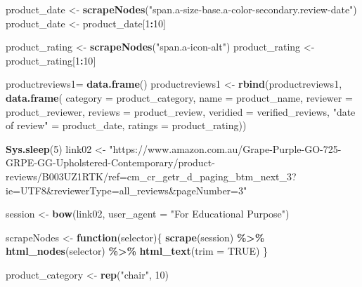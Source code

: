 \documentclass[
]{article}
\newenvironment{Shaded}{\begin{snugshade}}{\end{snugshade}}
\newcommand{\AttributeTok}[1]{\textcolor[rgb]{0.13,0.29,0.53}{#1}}
\newcommand{\ConstantTok}[1]{\textcolor[rgb]{0.56,0.35,0.01}{#1}}
\newcommand{\ControlFlowTok}[1]{\textcolor[rgb]{0.13,0.29,0.53}{\textbf{#1}}}
\newcommand{\DecValTok}[1]{\textcolor[rgb]{0.00,0.00,0.81}{#1}}
\newcommand{\FunctionTok}[1]{\textcolor[rgb]{0.13,0.29,0.53}{\textbf{#1}}}
\newcommand{\NormalTok}[1]{#1}
\newcommand{\OtherTok}[1]{\textcolor[rgb]{0.56,0.35,0.01}{#1}}
\newcommand{\SpecialCharTok}[1]{\textcolor[rgb]{0.81,0.36,0.00}{\textbf{#1}}}
\newcommand{\StringTok}[1]{\textcolor[rgb]{0.31,0.60,0.02}{#1}}
\begin{document}
\begin{Shaded}
\begin{Highlighting}[]
\NormalTok{  product\_date }\OtherTok{\textless{}{-}} \FunctionTok{scrapeNodes}\NormalTok{(}\StringTok{"span.a{-}size{-}base.a{-}color{-}secondary.review{-}date"}\NormalTok{)}
\NormalTok{  product\_date }\OtherTok{\textless{}{-}}\NormalTok{ product\_date[}\DecValTok{1}\SpecialCharTok{:}\DecValTok{10}\NormalTok{]}
  
\NormalTok{  product\_rating }\OtherTok{\textless{}{-}} \FunctionTok{scrapeNodes}\NormalTok{(}\StringTok{"span.a{-}icon{-}alt"}\NormalTok{)}
\NormalTok{  product\_rating }\OtherTok{\textless{}{-}}\NormalTok{ product\_rating[}\DecValTok{1}\SpecialCharTok{:}\DecValTok{10}\NormalTok{]}
  
\NormalTok{  productreviews1}\OtherTok{=} \FunctionTok{data.frame}\NormalTok{()}
\NormalTok{  productreviews1 }\OtherTok{\textless{}{-}} \FunctionTok{rbind}\NormalTok{(productreviews1, }\FunctionTok{data.frame}\NormalTok{(}
                      \AttributeTok{category =}\NormalTok{ product\_category,}
                      \AttributeTok{name =}\NormalTok{ product\_name,}
                      \AttributeTok{reviewer =}\NormalTok{ product\_reviewer,}
                      \AttributeTok{reviews =}\NormalTok{ product\_review,}
                      \AttributeTok{veridied =}\NormalTok{ verified\_reviews,}
                      \StringTok{"date of review"} \OtherTok{=}\NormalTok{ product\_date,}
                      \AttributeTok{ratings =}\NormalTok{ product\_rating))}

  
 \FunctionTok{Sys.sleep}\NormalTok{(}\DecValTok{5}\NormalTok{)}
\NormalTok{link02 }\OtherTok{\textless{}{-}} \StringTok{"https://www.amazon.com.au/Grape{-}Purple{-}GO{-}725{-}GRPE{-}GG{-}Upholstered{-}Contemporary/product{-}reviews/B003UZ1RTK/ref=cm\_cr\_getr\_d\_paging\_btm\_next\_3?ie=UTF8\&reviewerType=all\_reviews\&pageNumber=3"}


\NormalTok{  session }\OtherTok{\textless{}{-}} \FunctionTok{bow}\NormalTok{(link02,}
               \AttributeTok{user\_agent =} \StringTok{"For Educational Purpose"}\NormalTok{)}

\NormalTok{  scrapeNodes }\OtherTok{\textless{}{-}} \ControlFlowTok{function}\NormalTok{(selector)\{}
    \FunctionTok{scrape}\NormalTok{(session) }\SpecialCharTok{\%\textgreater{}\%}
      \FunctionTok{html\_nodes}\NormalTok{(selector) }\SpecialCharTok{\%\textgreater{}\%}
      \FunctionTok{html\_text}\NormalTok{(}\AttributeTok{trim =} \ConstantTok{TRUE}\NormalTok{)}
\NormalTok{  \}}

\NormalTok{  product\_category }\OtherTok{\textless{}{-}} \FunctionTok{rep}\NormalTok{(}\StringTok{"chair"}\NormalTok{, }\DecValTok{10}\NormalTok{)}


\end{Highlighting}
\end{Shaded}
\end{document}
